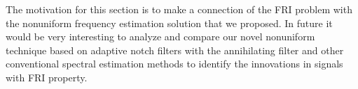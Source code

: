 \documentclass{UCF_ETD}
\begin{document}
The motivation for this section is to make a connection of the FRI problem with the nonuniform frequency estimation solution that we proposed. In future it would be very interesting to analyze and compare our novel nonuniform technique based on adaptive notch filters with the annihilating filter and other conventional spectral estimation methods to identify the innovations in signals with FRI property.
%
\end{document}
